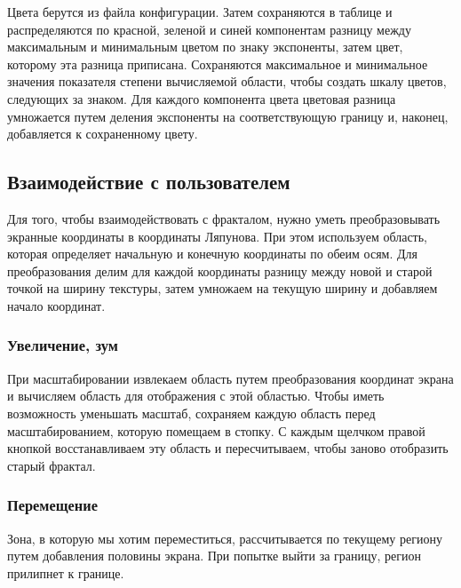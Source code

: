 \documentclass[a5paper,10pt, twoside]{article} %
\begin{document}
	Цвета берутся из файла конфигурации.
  Затем сохраняются в таблице и распределяются по красной, зеленой и синей компонентам 
  разницу между максимальным и минимальным цветом по знаку экспоненты, затем цвет, которому эта разница приписана.
  Сохраняются максимальное и минимальное значения показателя степени вычисляемой области, чтобы создать шкалу цветов, 
  следующих за знаком. Для каждого компонента цвета цветовая разница умножается путем деления экспоненты на 
  соответствующую границу и, наконец, добавляется к сохраненному цвету.

	\subsection{Взаимодействие с пользователем}

  Для того, чтобы взаимодействовать с фракталом, нужно уметь преобразовывать экранные координаты в координаты Ляпунова.
  При этом используем область, которая определяет начальную и конечную координаты по обеим осям.
  Для преобразования делим для каждой координаты разницу между новой и старой точкой на ширину текстуры, 
  затем умножаем на текущую ширину и добавляем начало координат.

  \subsubsection{Увеличение, зум}

  При масштабировании извлекаем область путем преобразования координат экрана и вычисляем область 
  для отображения с этой областью.
  Чтобы иметь возможность уменьшать масштаб, сохраняем каждую область перед масштабированием, которую помещаем в стопку.
  С каждым щелчком правой кнопкой восстанавливаем эту область и пересчитываем, чтобы заново отобразить старый фрактал.

  \subsubsection{Перемещение}
  
  Зона, в которую мы хотим переместиться, рассчитывается по текущему региону путем добавления половины экрана.
  При попытке выйти за границу, регион прилипнет к границе.
\end{document}
